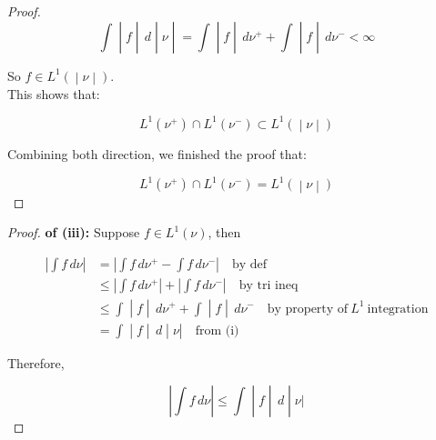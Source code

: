 \documentclass{qlnotes-export}
\begin{document}
\begin{proof}
\[\left. \int \middle| f \middle| \, d \middle| \nu \middle| = \int \middle| f \middle| \, d\nu^{+} + \int \middle| f \middle| \, d\nu^{-} < \infty \right.\]

So \(\left. f \in L^{1}( \middle| \nu \middle| ) \right.\).\\
This shows that:

\[\left. L^{1}(\nu^{+}) \cap L^{1}(\nu^{-}) \subset L^{1}( \middle| \nu \middle| ) \right.\]

Combining both direction, we finished the proof that:

\[\left. L^{1}(\nu^{+}) \cap L^{1}(\nu^{-}) = L^{1}( \middle| \nu \middle| ) \right.\]

\end{proof}

\begin{proof}

\textbf{of (iii):} Suppose \(f \in L^{1}(\nu)\), then

\[\begin{matrix}
\left| {\int f\, d\nu} \right| & {= \left| {\int f\, d\nu^{+} - \int f\, d\nu^{-}} \right|\quad\text{by def}} \\
 & {\leq \left| {\int f\, d\nu^{+}} \right| + \left| {\int f\, d\nu^{-}} \right|\quad\text{by tri ineq}} \\
 & \left. \leq \int \middle| f \middle| \, d\nu^{+} + \int \middle| f \middle| \, d\nu^{-}\quad\text{by property of}\ L^{1}\ \text{integration} \right. \\
 & {\left. = \int \middle| f \middle| \, d \middle| \nu \right|\quad\text{from (i)}}
\end{matrix}\]

Therefore,

\[\left. \left| {\int f\, d\nu} \right| \leq \int \middle| f \middle| \, d \middle| \nu| \right.\]

\end{proof}
\end{document}
